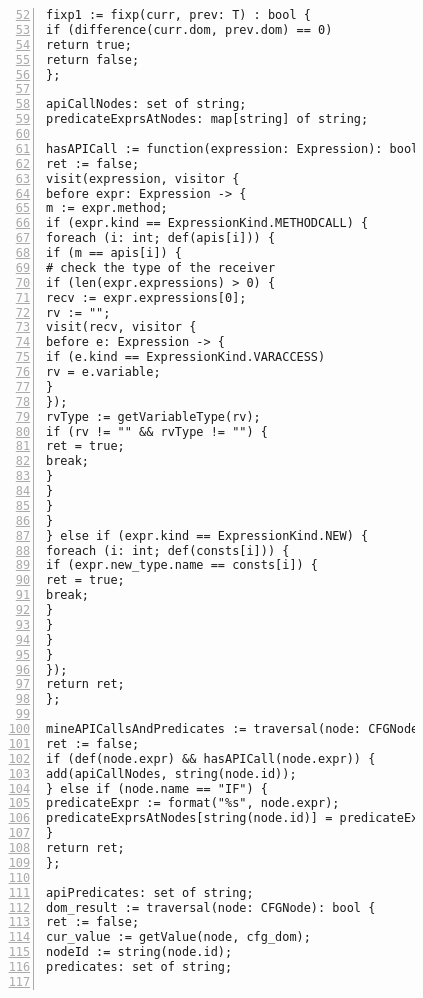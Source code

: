 \begin{figure}[ht!]
\begin{lstlisting}[numbers=left, tabsize=4, escapechar=@, caption={API Precondition Mining Analysis},label={lst:apm-code}, firstline = 52, firstnumber = 52, lastline = 112]
fixp1 := fixp(curr, prev: T) : bool {
if (difference(curr.dom, prev.dom) == 0)
return true;	
return false;
};

apiCallNodes: set of string;
predicateExprsAtNodes: map[string] of string;

hasAPICall := function(expression: Expression): bool {
ret := false;
visit(expression, visitor {
before expr: Expression -> {
m := expr.method;
if (expr.kind == ExpressionKind.METHODCALL) {
foreach (i: int; def(apis[i])) {
if (m == apis[i]) {
# check the type of the receiver
if (len(expr.expressions) > 0) {
recv := expr.expressions[0];
rv := "";
visit(recv, visitor {
before e: Expression -> {
if (e.kind == ExpressionKind.VARACCESS) 
rv = e.variable;
}
});
rvType := getVariableType(rv);
if (rv != "" && rvType != "") {
ret = true;
break;
}
}
}
} 
} else if (expr.kind == ExpressionKind.NEW) {
foreach (i: int; def(consts[i])) {
if (expr.new_type.name == consts[i]) {
ret = true;
break;
}
}
}
}
});
return ret;
};

mineAPICallsAndPredicates := traversal(node: CFGNode): bool { 
ret := false;
if (def(node.expr) && hasAPICall(node.expr)) {
add(apiCallNodes, string(node.id));
} else if (node.name == "IF") {
predicateExpr := format("%s", node.expr);
predicateExprsAtNodes[string(node.id)] = predicateExpr;
}
return ret;
};

apiPredicates: set of string;
dom_result := traversal(node: CFGNode): bool {
ret := false;
cur_value := getValue(node, cfg_dom);
nodeId := string(node.id);
predicates: set of string;


\end{lstlisting}
\end{figure}
